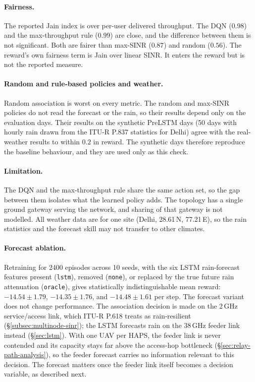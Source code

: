 \documentclass[conference]{IEEEtran}
\begin{document}
\paragraph{Fairness.} The reported Jain index is over per-user delivered throughput. The DQN ($0.98$) and the max-throughput rule ($0.99$) are close, and the difference between them is not significant. Both are fairer than max-SINR ($0.87$) and random ($0.56$). The reward's own fairness term is Jain over linear SINR. It enters the reward but is not the reported measure.

\paragraph{Random and rule-based policies and weather.} Random association is worst on every metric. The random and max-SINR policies do not read the forecast or the rain, so their results depend only on the evaluation days. Their results on the synthetic PreLSTM days (50 days with hourly rain drawn from the ITU-R P.837 statistics for Delhi) agree with the real-weather results to within $0.2$ in reward. The synthetic days therefore reproduce the baseline behaviour, and they are used only as this check.

\paragraph{Limitation.} The DQN and the max-throughput rule share the same action set, so the gap between them isolates what the learned policy adds. The topology has a single ground gateway serving the network, and sharing of that gateway is not modelled. All weather data are for one site (Delhi, 28.61\,N, 77.21\,E), so the rain statistics and the forecast skill may not transfer to other climates.

\paragraph{Forecast ablation.} Retraining for 2400 episodes across 10 seeds, with the six LSTM rain-forecast features present (\texttt{lstm}), removed (\texttt{none}), or replaced by the true future rain attenuation (\texttt{oracle}), gives statistically indistinguishable mean reward: $-14.54\pm1.79$, $-14.35\pm1.76$, and $-14.48\pm1.61$ per step. The forecast variant does not change performance. The association decision is made on the 2\,GHz service/access link, which ITU-R P.618 treats as rain-resilient (\S\ref{subsec:multinode-sinr}); the LSTM forecasts rain on the 38\,GHz feeder link instead (\S\ref{sec:lstm}). With one UAV per HAPS, the feeder link is never contended and its capacity stays far above the access-hop bottleneck (\S\ref{sec:relay-path-analysis}), so the feeder forecast carries no information relevant to this decision. The forecast matters once the feeder link itself becomes a decision variable, as described next.
\end{document}

